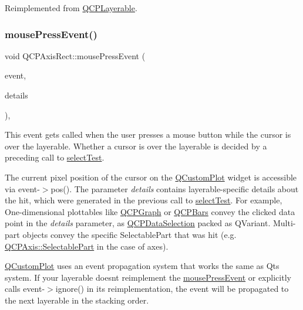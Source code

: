 Reimplemented from \hyperlink{class_q_c_p_layerable_a9eee1ba47fd69be111059ca3881933e4}{Q\+C\+P\+Layerable}.

\mbox{\label{class_q_c_p_axis_rect_aa9a7c807eaa4666870ac94aa6abc4dde}} 
\subsubsection{\texorpdfstring{mouse\+Press\+Event()}{mousePressEvent()}\hspace{0.1cm}{\footnotesize\ttfamily [1/2]}}
{\footnotesize\ttfamily void Q\+C\+P\+Axis\+Rect\+::mouse\+Press\+Event (\begin{DoxyParamCaption}\item[{Q\+Mouse\+Event $\ast$}]{event,  }\item[{const Q\+Variant \&}]{details }\end{DoxyParamCaption})\hspace{0.3cm}{\ttfamily [protected]}, {\ttfamily [virtual]}}

This event gets called when the user presses a mouse button while the cursor is over the layerable. Whether a cursor is over the layerable is decided by a preceding call to \hyperlink{class_q_c_p_layout_element_ae97f483cccedadbf18ea4525ef240ee4}{select\+Test}.

The current pixel position of the cursor on the \hyperlink{class_q_custom_plot}{Q\+Custom\+Plot} widget is accessible via {\ttfamily event-\/$>$pos()}. The parameter {\itshape details} contains layerable-\/specific details about the hit, which were generated in the previous call to \hyperlink{class_q_c_p_layout_element_ae97f483cccedadbf18ea4525ef240ee4}{select\+Test}. For example, One-\/dimensional plottables like \hyperlink{class_q_c_p_graph}{Q\+C\+P\+Graph} or \hyperlink{class_q_c_p_bars}{Q\+C\+P\+Bars} convey the clicked data point in the {\itshape details} parameter, as \hyperlink{class_q_c_p_data_selection}{Q\+C\+P\+Data\+Selection} packed as Q\+Variant. Multi-\/part objects convey the specific {\ttfamily Selectable\+Part} that was hit (e.\+g. \hyperlink{class_q_c_p_axis_abee4c7a54c468b1385dfce2c898b115f}{Q\+C\+P\+Axis\+::\+Selectable\+Part} in the case of axes).

\hyperlink{class_q_custom_plot}{Q\+Custom\+Plot} uses an event propagation system that works the same as Qt\textquotesingle{}s system. If your layerable doesn\textquotesingle{}t reimplement the \hyperlink{class_q_c_p_axis_rect_aa9a7c807eaa4666870ac94aa6abc4dde}{mouse\+Press\+Event} or explicitly calls {\ttfamily event-\/$>$ignore()} in its reimplementation, the event will be propagated to the next layerable in the stacking order.

